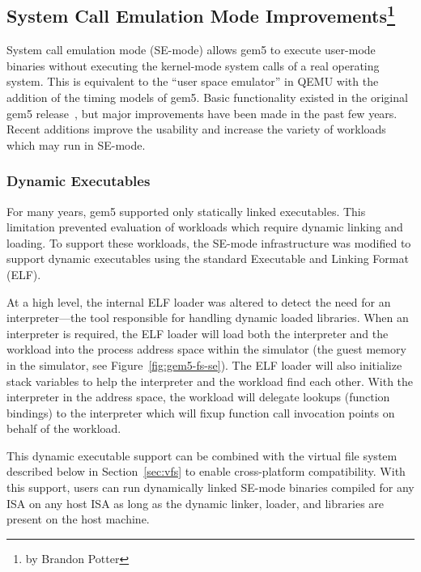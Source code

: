 \subsection[System Call Emulation Mode Improvements]{System Call Emulation Mode Improvements\footnote{by Brandon Potter}}
\label{sec:se-mode}

System call emulation mode (SE-mode) allows gem5 to execute user-mode binaries without executing the kernel-mode system calls of a real operating system.
This is equivalent to the ``user space emulator'' in QEMU with the addition of the timing models of gem5.
Basic functionality existed in the original gem5 release~\cite{Binkert-gem5-2011}, but major improvements have been made in the past few years.
Recent additions improve the usability and increase the variety of workloads which may run in SE-mode.

\subsubsection{Dynamic Executables}

For many years, gem5 supported only statically linked executables.
This limitation prevented evaluation of workloads which require dynamic linking and loading.
To support these workloads, the SE-mode infrastructure was modified to support dynamic executables using the standard Executable and Linking Format (ELF).

At a high level, the internal ELF loader was altered to detect the need for an interpreter---the tool responsible for handling dynamic loaded libraries.
When an interpreter is required, the ELF loader will load both the interpreter and the workload into the process address space within the simulator (the guest memory in the simulator, see Figure~\ref{fig:gem5-fs-se}).
The ELF loader will also initialize stack variables to help the interpreter and the workload find each other.
With the interpreter in the address space, the workload will delegate lookups (function bindings) to the interpreter which will fixup function call invocation points on behalf of the workload.


This dynamic executable support can be combined with the virtual file system described below in Section~\ref{sec:vfs} to enable cross-platform compatibility.
With this support, users can run dynamically linked SE-mode binaries compiled for any ISA on any host ISA as long as the dynamic linker, loader, and libraries are present on the host machine.


